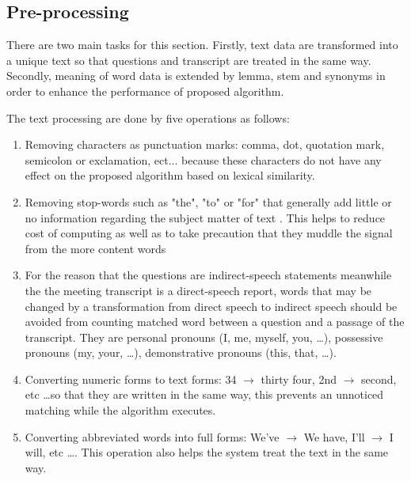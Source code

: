 \documentclass[10pt,a4paper]{article}
\numberwithin{algorithm}{section}  %
\begin{document}
\subsection{Pre-processing}
There are two main tasks for this section. Firstly, text data are transformed into a unique text so that questions and transcript are treated in the same way. Secondly, meaning of word data is extended by lemma, stem and synonyms in order to enhance the performance of proposed algorithm.

The text processing are done by five operations as follows:

\begin{enumerate}
\item {Removing characters as punctuation marks: comma, dot, quotation mark, semicolon or exclamation, ect...  because these characters do not have any effect on the proposed algorithm based on lexical similarity. } 

\item {Removing stop-words such as "the", "to" or "for" that generally add little or no information regarding the subject matter of text \cite{mckechnie2001cap}. This helps to reduce cost of computing as well as to take precaution that they muddle the signal from the more content words \cite{hirschman1999drr}}

\item {For the reason that the questions are indirect-speech statements meanwhile the the meeting transcript is a direct-speech report, words that may be changed by a transformation from direct speech to indirect speech should be avoided from counting matched word between a question and a passage of the transcript. They are personal pronouns (I, me, myself, you, \ldots), possessive pronouns (my, your, \ldots), demonstrative pronouns (this, that, \ldots).}



\item {Converting numeric forms to text forms: 34 \ensuremath{\rightarrow} thirty four, 2nd \ensuremath{\rightarrow} second, etc \ldots so that they are written in the same way, this prevents an unnoticed matching while the algorithm executes. }

\item {Converting abbreviated words into full forms: We've \ensuremath{\rightarrow} We have, I'll \ensuremath{\rightarrow} I will, etc \ldots. This operation also helps the system treat the text in the same way.}
\end{enumerate}
\end{document}
